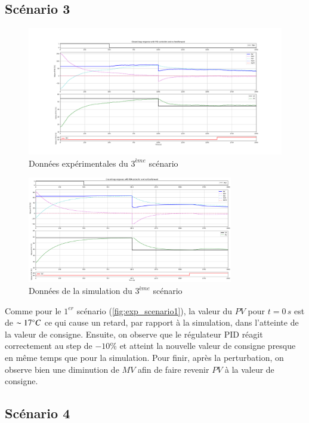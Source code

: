 \subsection{Scénario 3}

\begin{figure}[H]
	\centering
	\includegraphics[width=1\textwidth]{../Plots/Experiment_scenario_5_2024-03-30-15h32.png}
	\caption{Données expérimentales du $3^{ème}$ scénario}
	\label{fig:exp_scenario3}
\end{figure}
\begin{figure}[H]
	\centering
	\includegraphics[width=0.8\textwidth]{figures/scenario5.png}
	\caption{Données de la simulation du $3^{ème}$ scénario}
	\label{fig:sim_scenario3}
\end{figure}

Comme pour le $1^{er}$ scénario (\ref{fig:exp_scenario1}), la valeur du $PV$ pour $t = 0\,s$ est de $\sim 17\degree C$ ce qui cause un retard, par rapport à la simulation, dans l'atteinte de la valeur
de consigne. Ensuite, on observe que le régulateur PID réagit correctement au step de $-10\%$ et atteint la nouvelle valeur de consigne presque en même temps que
pour la simulation. Pour finir, après la perturbation, on observe bien une diminution de $MV$ afin de faire revenir $PV$ à la valeur de consigne. 

\subsection{Scénario 4}

